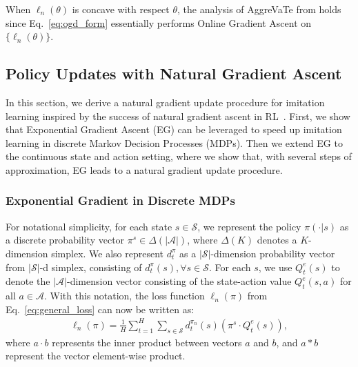 \documentclass{article}
\newcommand{\BB}[1]{\textcolor{red}{\bf Byron: {#1}}}
\begin{document}
When $\ell_n(\theta)$ is concave with respect $\theta$, the analysis of AggreVaTe from \cite{ross2014reinforcement} holds since Eq.~\ref{eq:ogd_form} essentially performs Online Gradient Ascent on $\{\ell_n(\theta)\}$.


\subsection{Policy Updates with Natural Gradient Ascent}
In this section, we derive a natural gradient update procedure for imitation learning inspired by the success of natural gradient ascent in RL~\cite{kakade2002natural,bagnell2003covariant,schulman2015trust}. First, we show that Exponential Gradient Ascent (EG) can be leveraged to speed up imitation learning in discrete Markov Decision Processes (MDPs). Then we extend EG to the continuous state and action setting, where we show that, with several steps of approximation, EG leads to a natural gradient update procedure. 

\subsubsection{Exponential Gradient in Discrete MDPs}
For notational simplicity, for each state $s\in\mathcal{S}$, we represent the policy $\pi(\cdot |s)$ as a discrete probability vector $\pi^s \in \Delta(|\mathcal{A}|)$, where $\Delta(K)$ denotes a $K$-dimension simplex. We also represent $d_t^{\pi}$ as a $|\mathcal{S}|$-dimension probability vector from $|\mathcal{S}|$-d simplex, consisting of $d_t^{\pi}(s), \forall s\in\mathcal{S}$. 
For each $s$, we use $Q^e_t(s)$ to denote the $|\mathcal{A}|$-dimension vector consisting of the state-action value $Q^e_t(s,a)$ for all $a\in\mathcal{A}$. With this notation, the loss function $\ell_n(\pi)$ from Eq.~\ref{eq:general_loss} can now be written as:
\begin{align}
\ell_n(\pi) = \frac{1}{H}\sum_{t=1}^H \sum_{s\in\mathcal{S}} d_t^{\pi_n}(s)( \pi^s\cdot Q^e_t(s)), \nonumber
\end{align} where $a\cdot b$ represents the inner product between vectors $a$ and $b$, and $a*b$ represent the vector element-wise product.
\end{document}
